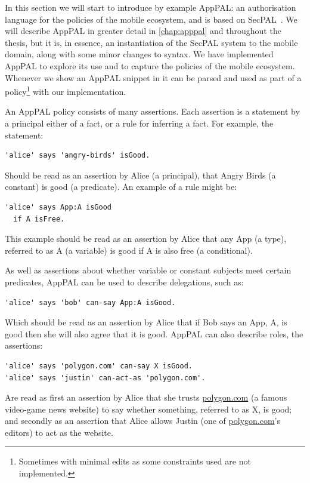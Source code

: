 \documentclass[thesis.tex]{subfiles}
\begin{document}
In this section we will start to introduce by example AppPAL: an authorisation
language for the policies of the mobile ecosystem, and is based on
SecPAL~\cite{becker_secpal:_2006}. We will describe AppPAL in greater detail in
\autoref{chap:apppal} and throughout the thesis, but it is, in essence, an
instantiation of the SecPAL system to the mobile domain, along with some minor
changes to syntax. We have implemented AppPAL to explore its use and to capture
the policies of the mobile ecosystem. Whenever we show an AppPAL snippet in
 it can be parsed and used as part of a
policy\footnote{Sometimes with minimal edits as some constraints used are not
implemented.} with our implementation.

An AppPAL policy consists of many assertions.  Each assertion is a statement by
a principal either of a fact, or a rule for inferring a fact.  For example, the statement:
\begin{lstlisting}
'alice' says 'angry-birds' isGood.
\end{lstlisting}
Should be read as an assertion by Alice (a principal), that Angry Birds (a
constant) is good (a predicate).  An example of a rule might be:
\begin{lstlisting}
'alice' says App:A isGood 
  if A isFree.
\end{lstlisting}
This example should be read as an assertion by Alice that any App (a type),
referred to as A (a variable) is good if A is also free (a conditional).   

As well as assertions about whether variable or constant subjects meet certain
predicates, AppPAL can be used to describe delegations, such as:
\begin{lstlisting}
'alice' says 'bob' can-say App:A isGood.
\end{lstlisting}

\pagebreak
Which should be read as an assertion by Alice that if Bob says an App, A, is
good then she will also agree that it is good.  AppPAL can also describe roles,
the assertions:
\begin{lstlisting}
'alice' says 'polygon.com' can-say X isGood.
'alice' says 'justin' can-act-as 'polygon.com'.
\end{lstlisting}
Are read as first an assertion by Alice that she trusts \url{polygon.com} (a
famous video-game news website) to say whether something, referred to as X, is
good; and secondly as an assertion that Alice allows Justin (one of
\url{polygon.com}'s editors) to act as the website.  
\end{document}
